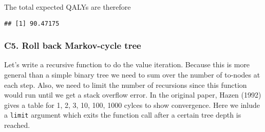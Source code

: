 \documentclass[]{book}
\newenvironment{Shaded}{\begin{snugshade}}{\end{snugshade}}
\newcommand{\KeywordTok}[1]{\textcolor[rgb]{0.13,0.29,0.53}{\textbf{#1}}}
\newcommand{\NormalTok}[1]{#1}
\newcommand{\OperatorTok}[1]{\textcolor[rgb]{0.81,0.36,0.00}{\textbf{#1}}}
\begin{document}
The total expected QALYs are therefore

\begin{Shaded}
\end{Shaded}

\begin{verbatim}
## [1] 90.47175
\end{verbatim}

\hypertarget{c5.-roll-back-markov-cycle-tree}{%
\subsubsection{C5. Roll back Markov-cycle tree}\label{c5.-roll-back-markov-cycle-tree}}

Let's write a recursive function to do the value iteration.
Because this is more general than a simple binary tree we need to sum over the number of to-nodes at each step.
Also, we need to limit the number of recursions since this function would run until we get a stack overflow error.
In the original paper, Hazen (1992) gives a table for 1, 2, 3, 10, 100, 1000 cylces to show convergence.
Here we inlude a \texttt{limit} argument which exits the function call after a certain tree depth is reached.
\end{document}
